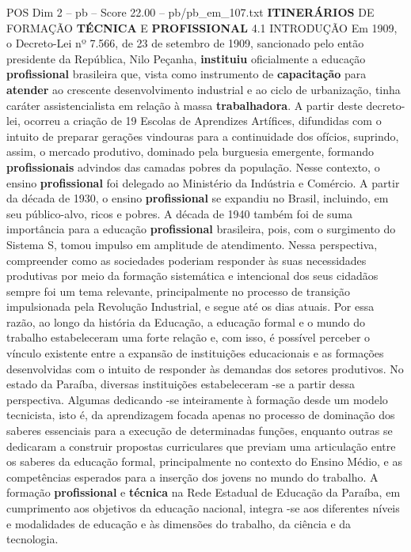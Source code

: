 \begin{textsample}{POS Dim 2 – pb – Score 22.00 – pb/pb\_em\_107.txt}  \label{ex:f2_pos_275}
\textbf{ITINERÁRIOS} DE FORMAÇÃO \textbf{TÉCNICA} E \textbf{PROFISSIONAL} 4.1 INTRODUÇÃO Em 1909, o Decreto-Lei nº 7.566, de 23 de setembro de 1909, sancionado pelo então presidente da República, Nilo Peçanha, \textbf{instituiu} oficialmente a educação \textbf{profissional} brasileira que, vista como instrumento de \textbf{capacitação} para \textbf{atender} ao crescente desenvolvimento industrial e ao ciclo de urbanização, tinha caráter assistencialista em relação à massa \textbf{trabalhadora}.
A partir deste decreto-lei, ocorreu a criação de 19 Escolas de Aprendizes Artífices, difundidas com o intuito de preparar gerações vindouras para a continuidade dos ofícios, suprindo, assim, o mercado produtivo, dominado pela burguesia emergente, formando \textbf{profissionais} advindos das camadas pobres da população.
Nesse contexto, o ensino \textbf{profissional} foi delegado ao Ministério da Indústria e Comércio.
A partir da década de 1930, o ensino \textbf{profissional} se expandiu no Brasil, incluindo, em seu público-alvo, ricos e pobres.
A década de 1940 também foi de suma importância para a educação \textbf{profissional} brasileira, pois, com o surgimento do Sistema S, tomou impulso em amplitude de atendimento.
Nessa perspectiva, compreender como as sociedades poderiam responder às suas necessidades produtivas por meio da formação sistemática e intencional dos seus cidadãos sempre foi um tema relevante, principalmente no processo de transição impulsionada pela Revolução Industrial, e segue até os dias atuais.
Por essa razão, ao longo da história da Educação, a educação formal e o mundo do trabalho estabeleceram uma forte relação e, com isso, é possível perceber o vínculo existente entre a expansão de instituições educacionais e as formações desenvolvidas com o intuito de responder às demandas dos setores produtivos.
No estado da Paraíba, diversas instituições estabeleceram -se a partir dessa perspectiva.
Algumas dedicando -se inteiramente à formação desde um modelo tecnicista, isto é, da aprendizagem focada apenas no processo de dominação dos saberes essenciais para a execução de determinadas funções, enquanto outras se dedicaram a construir propostas curriculares que previam uma articulação entre os saberes da educação formal, principalmente no contexto do Ensino Médio, e as competências esperados para a inserção dos jovens no mundo do trabalho.
A formação \textbf{profissional} e \textbf{técnica} na Rede Estadual de Educação da Paraíba, em cumprimento aos objetivos da educação nacional, integra -se aos diferentes níveis e modalidades de educação e às dimensões do trabalho, da ciência e da tecnologia.

\end{textsample}
